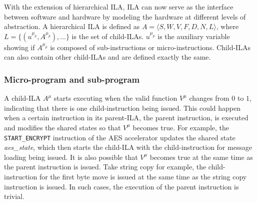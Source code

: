 \iffalse
Summarizing the above definition, a child-ILA is defined as follow:
\begin{eqnarray}
  A^\mu &=& \langle S^\mu, V^\mu, F^\mu, D^\mu, N^\mu \rangle 
        \text{, where} \nonumber \\
    &S^\mu& \text{ is the vector of state variables, } \nonumber \\
    &V^\mu& : S^\mu \mapsto \bd \text{ is the valid function, } \nonumber \\
    &F^\mu& : S^\mu \mapsto bvec_l \text{ is the fetch function, } \nonumber \\
    &D^\mu& = \{ \delta_j^\mu : bvec_l \mapsto \bd \}
            \text{ is the decode function, and} \nonumber \\
    &N^\mu& = \{ N_j^\mu : S^\mu \mapsto S^\mu \}
            \text{ is the next state function.} \nonumber
\end{eqnarray}
\fi

With the extension of hierarchical ILA, ILA can now serve as the interface 
between software and hardware by modeling the hardware at different levels of
abstraction.
A hierarchical ILA is defined as
$A = \langle S, W, V, F, D, N, L \rangle$, where 
$L = \{ (u^{\mu_p}, A^{\mu_p}), \dots \}$ is the set of child-ILAs.
$u^{\mu_p}$ is the auxiliary variable showing if $A^{\mu_p}$ is composed of 
sub-instructions or micro-instructions.
Child-ILAs can also contain other child-ILAs and are defined exactly the same.

\subsubsection*{Micro-program and sub-program}
%
A child-ILA $A^\mu$ starts executing when the valid function $V^\mu$ changes 
from $0$ to $1$, indicating that there is one child-instruction being issued.
%
This could happen when a certain instruction in its parent-ILA, the parent 
instruction, is executed and modifies the shared states so that $V^\mu$ becomes 
true.
For example, the \texttt{START\_ENCRYPT} instruction of the AES accelerator 
updates the shared state \textit{aes\_state}, which then starts the child-ILA
with the child-instruction for message loading being issued.
%
It is also possible that $V^\mu$ becomes true at the same time as the parent
instruction is issued.
Take string copy for example, the child-instruction for the first
byte move is issued at the same time as the string copy instruction is issued.
In such cases, the execution of the parent instruction is trivial.

